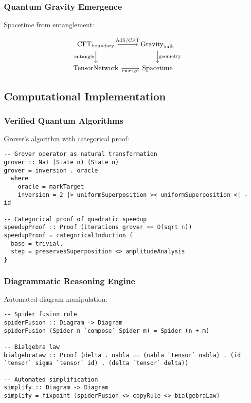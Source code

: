 \subsubsection{Quantum Gravity Emergence}

Spacetime from entanglement:

\[
\begin{tikzcd}
\text{CFT}_{\text{boundary}} \arrow[r, "\text{AdS/CFT}"] \arrow[d, "\text{entangle}"'] & 
\text{Gravity}_{\text{bulk}} \arrow[d, "\text{geometry}"] \\
\text{TensorNetwork} \arrow[r, "\text{emerge}"'] & 
\text{Spacetime}
\end{tikzcd}
\]

\subsection{Computational Implementation}

\subsubsection{Verified Quantum Algorithms}

Grover's algorithm with categorical proof:

\begin{verbatim}
-- Grover operator as natural transformation
grover :: Nat (State n) (State n)
grover = inversion . oracle
  where
    oracle = markTarget
    inversion = 2 |> uniformSuperposition >< uniformSuperposition <| - id

-- Categorical proof of quadratic speedup
speedupProof :: Proof (Iterations grover == O(sqrt n))
speedupProof = categoricalInduction {
  base = trivial,
  step = preservesSuperposition <> amplitudeAnalysis
}
\end{verbatim}

\subsubsection{Diagrammatic Reasoning Engine}

Automated diagram manipulation:

\begin{verbatim}
-- Spider fusion rule
spiderFusion :: Diagram -> Diagram
spiderFusion (Spider n `compose` Spider m) = Spider (n + m)

-- Bialgebra law
bialgebraLaw :: Proof (delta . nabla == (nabla `tensor` nabla) . (id `tensor` sigma `tensor` id) . (delta `tensor` delta))

-- Automated simplification
simplify :: Diagram -> Diagram
simplify = fixpoint (spiderFusion <> copyRule <> bialgebraLaw)
\end{verbatim}

